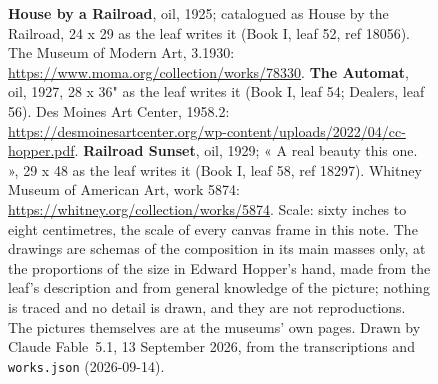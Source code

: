 \begin{figure}[htbp]
\caption{\textbf{House by a Railroad}, oil, 1925; catalogued as House by the Railroad, 24 x 29 as the leaf writes it (Book I, leaf 52, ref 18056). The Museum of Modern Art, 3.1930: \url{https://www.moma.org/collection/works/78330}. \textbf{The Automat}, oil, 1927, 28 x 36" as the leaf writes it (Book I, leaf 54; Dealers, leaf 56). Des Moines Art Center, 1958.2: \url{https://desmoinesartcenter.org/wp-content/uploads/2022/04/cc-hopper.pdf}. \textbf{Railroad Sunset}, oil, 1929; « A real beauty this one. », 29 x 48 as the leaf writes it (Book I, leaf 58, ref 18297). Whitney Museum of American Art, work 5874: \url{https://whitney.org/collection/works/5874}. Scale: sixty inches to eight centimetres, the scale of every canvas frame in this note. The drawings are schemas of the composition in its main masses only, at the proportions of the size in Edward Hopper's hand, made from the leaf's description and from general knowledge of the picture; nothing is traced and no detail is drawn, and they are not reproductions. The pictures themselves are at the museums' own pages. Drawn by Claude Fable~5.1, 13 September 2026, from the transcriptions and \texttt{works.json} (2026-09-14).}\label{fig:bookioils}
\end{figure}
